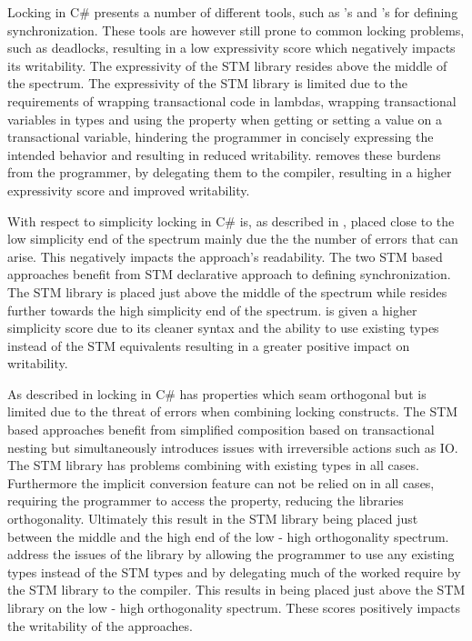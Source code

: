 Locking in C\# presents a number of different tools, such as 's and 's for defining synchronization. These tools are however still prone to common locking problems, such as deadlocks, resulting in a low expressivity score which negatively impacts its writability. The expressivity of the \ac{STM} library resides above the middle of the spectrum. The expressivity of the \ac{STM} library is limited due to the requirements of wrapping transactional code in lambdas, wrapping transactional variables in  types and using the  property when getting or setting a value on a transactional variable, hindering the programmer in concisely expressing  the intended behavior and resulting in reduced writability. \stmname removes these burdens from the programmer, by delegating them to the compiler, resulting in a higher expressivity score and improved writability.

With respect to simplicity locking in C\# is, as described in , placed close to the low simplicity end of the spectrum mainly due the the number of errors that can arise. This negatively impacts the approach's readability. The two \ac{STM} based approaches benefit from \ac{STM} declarative approach to defining synchronization. The \ac{STM} library is placed just above the middle of the spectrum while \stmname resides further towards the high simplicity end of the spectrum. \stmname is given a higher simplicity score due to its cleaner syntax and the ability to use existing types instead of the \ac{STM} equivalents resulting in a greater positive impact on writability.

As described in  locking in C\# has properties which seam orthogonal but is limited due to the threat of errors when combining locking constructs. The \ac{STM} based approaches benefit from simplified composition based on transactional nesting but simultaneously introduces issues with irreversible actions such as \ac{IO}. The \ac{STM} library has problems combining with existing types in all cases. Furthermore the implicit conversion feature can not be relied on in all cases, requiring the programmer to access the  property, reducing the libraries orthogonality. Ultimately this result in the \ac{STM} library being placed just between the middle and the high end of the low - high orthogonality spectrum. \stmname address the issues of the  library by allowing the programmer to use any existing types instead of the \ac{STM} types and by delegating much of the worked require by the \ac{STM} library to the compiler. This results in \stmname being placed just above the \ac{STM} library on the  low - high orthogonality spectrum. These scores positively impacts the writability of the approaches.

